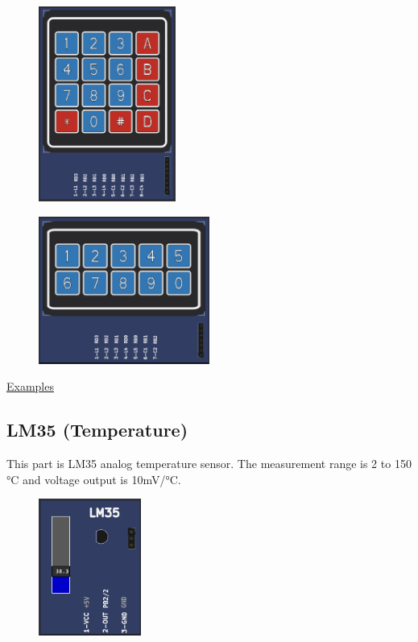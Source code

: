 \begin{figure}[H]
\center
\includegraphics[width=0.4\textwidth]{img/part_keyb_4x4.png} 
\end{figure} 

\begin{figure}[H]
\center
\includegraphics[width=0.5\textwidth]{img/part_keyb_2x5.png} 
\end{figure} 

\href{https://lcgamboa.github.io/picsimlab_examples/Parts.html\#Keypad}{Examples}

\subsection{LM35 (Temperature)}

This part is LM35 analog temperature sensor. The measurement range is 2 to 150 °C  and 
voltage output is 10mV/°C.

\begin{figure}[H]
\center
\includegraphics[width=0.3\textwidth]{img/part_lm35.png} 
\end{figure} 



